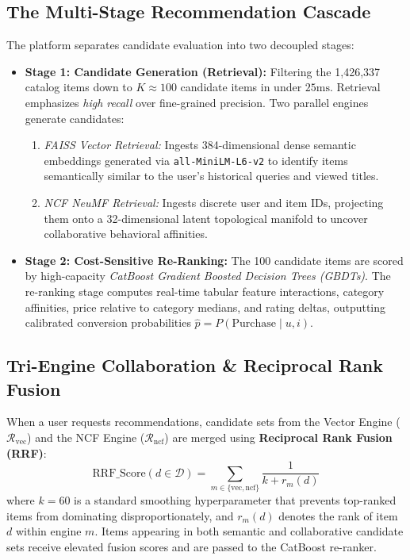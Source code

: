 \documentclass[11pt,a4paper]{article}
\begin{document}
\subsection{The Multi-Stage Recommendation Cascade}
The platform separates candidate evaluation into two decoupled stages:
\begin{itemize}[leftmargin=*]
    \item \textbf{Stage 1: Candidate Generation (Retrieval):}
    Filtering the 1,426,337 catalog items down to $K \approx 100$ candidate items in under $25\text{ms}$. Retrieval emphasizes \textit{high recall} over fine-grained precision. Two parallel engines generate candidates:
    \begin{enumerate}
        \item \textit{FAISS Vector Retrieval:} Ingests 384-dimensional dense semantic embeddings generated via \texttt{all-MiniLM-L6-v2} to identify items semantically similar to the user's historical queries and viewed titles.
        \item \textit{NCF NeuMF Retrieval:} Ingests discrete user and item IDs, projecting them onto a 32-dimensional latent topological manifold to uncover collaborative behavioral affinities.
    \end{enumerate}
    \item \textbf{Stage 2: Cost-Sensitive Re-Ranking:}
    The 100 candidate items are scored by high-capacity \textit{CatBoost Gradient Boosted Decision Trees (GBDTs)}. The re-ranking stage computes real-time tabular feature interactions, category affinities, price relative to category medians, and rating deltas, outputting calibrated conversion probabilities $\hat{p} = P(\text{Purchase} \mid u, i)$.
\end{itemize}

\subsection{Tri-Engine Collaboration \& Reciprocal Rank Fusion}
When a user requests recommendations, candidate sets from the Vector Engine ($\mathcal{R}_{\text{vec}}$) and the NCF Engine ($\mathcal{R}_{\text{ncf}}$) are merged using \textbf{Reciprocal Rank Fusion (RRF)}:
\begin{equation}
    \text{RRF\_Score}(d \in \mathcal{D}) = \sum_{m \in \{\text{vec}, \text{ncf}\}} \frac{1}{k + r_m(d)}
\end{equation}
where $k = 60$ is a standard smoothing hyperparameter that prevents top-ranked items from dominating disproportionately, and $r_m(d)$ denotes the rank of item $d$ within engine $m$. Items appearing in both semantic and collaborative candidate sets receive elevated fusion scores and are passed to the CatBoost re-ranker.
\end{document}
